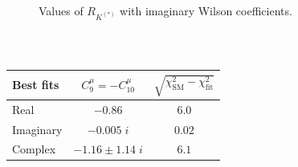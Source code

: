 \documentclass[mathserif, 10pt]{beamer}
\begin{document}
\begin{frame}
\begin{columns}
\begin{column}[t]{0.48\textwidth}
\begin{figure}
                Values of $R_{K^{(*)}}$ with imaginary Wilson coefficients.
            \end{figure}
        \end{column}
    \end{columns}

    ~

    \begin{table}
        \centering
        \begin{tabular}{|l|c|c|}\hline
            \textbf{Best fits} & $C_9^\mu=-C_{10}^\mu$ & $\sqrt{\chi^2_\mathrm{SM} - \chi^2_\mathrm{fit}}$ \\\hline
            Real               & $ -0.86$              & $6.0 $                                            \\\hline
            Imaginary          & $-0.005\;i $          & $0.02 $                                           \\\hline
            Complex            & $-1.16\pm 1.14\;i$    & $6.1$                                             \\\hline
        \end{tabular}
    \end{table}
\end{frame}
\end{document}
